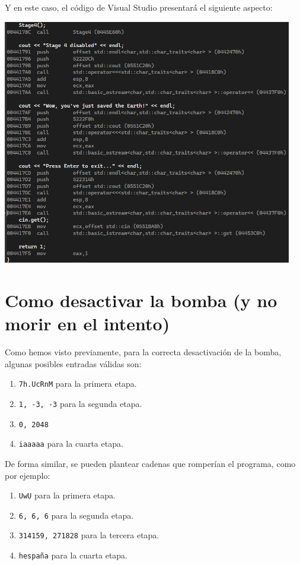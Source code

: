 \documentclass[11pt,a4paper]{article}
\begin{document}
\noindent Y en este caso, el código de Visual Studio presentará el siguiente aspecto:
\begin{center}
\includegraphics[width=0.95\textwidth]{s4-2.png}
\end{center}
\vspace{3ex}

\section{Como desactivar la bomba (y no morir en el intento)}
Como hemos visto previamente, para la correcta desactivación de la bomba, algunas posibles entradas válidas son:
\begin{enumerate}
  \item \texttt{7h.UcRnM} para la primera etapa.
  \item \texttt{1, -3, -3} para la segunda etapa.
  \item \texttt{0, 2048}
  \item \texttt{iaaaaa} para la cuarta etapa.
\end{enumerate}
\vspace{2ex}

\noindent De forma similar, se pueden plantear cadenas que romperían el programa, como por ejemplo:
\begin{enumerate}
  \item \texttt{UwU} para la primera etapa.
  \item \texttt{6, 6, 6} para la segunda etapa.
  \item \texttt{314159, 271828} para la tercera etapa.
  \item \texttt{hespaña} para la cuarta etapa.
\end{enumerate}
\vspace{3ex}
\end{document}
